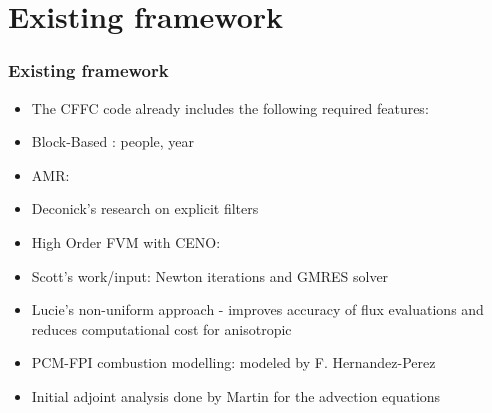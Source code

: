 \documentclass{beamer}
\begin{document}
\section[Framework]{Existing framework}
\begin{frame}%
\scriptsize
\frametitle{Existing framework}
\begin{itemize}
\item The CFFC code already includes the following required features:
\item Block-Based : people, year
\item AMR:
\item Deconick's research on explicit filters
\item High Order FVM with CENO:
\item Scott's work/input: Newton iterations and GMRES solver
\item Lucie's non-uniform approach - improves accuracy of flux evaluations and reduces computational cost for anisotropic
\item PCM-FPI combustion modelling: modeled by F. Hernandez-Perez 
\item Initial adjoint analysis done by Martin for the advection equations
\end{itemize}
\end{frame}

\end{document}
